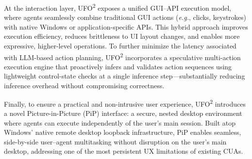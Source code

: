 \documentclass[sigplan,10pt]{acmart}
\newcommand{\name}{\textsc{UFO}\textsuperscript{2}\xspace}
\newcommand{\eg}{\textit{e.g.},\xspace}
\begin{document}
At the interaction layer, \name exposes a unified GUI–API execution model, where agents seamlessly combine traditional GUI actions (\eg clicks, keystrokes) with native Windows or application-specific APIs. This hybrid approach improves execution efficiency, reduces brittleness to UI layout changes, and enables more expressive, higher-level operations. To further minimize the latency associated with LLM-based action planning, \name incorporates a speculative multi-action execution engine that proactively infers and validates action sequences using lightweight control-state checks at a single inference step—substantially reducing inference overhead without compromising correctness.

Finally, to ensure a practical and non-intrusive user experience, \name introduces a novel Picture-in-Picture (PiP) interface: a secure, nested desktop environment where agents can execute independently of the user's main session. Built atop Windows' native remote desktop loopback infrastructure, PiP enables seamless, side-by-side user–agent multitasking without disruption on the user's main desktop, addressing one of the most persistent UX limitations of existing CUAs.
\end{document}
